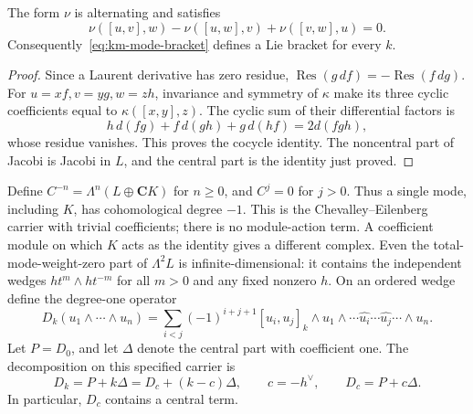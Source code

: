 \begin{lemma}
\label{lem:km-mode-cocycle}
The form $\nu$ is alternating and satisfies
\[
\nu([u,v],w)-\nu([u,w],v)+\nu([v,w],u)=0.
\]
Consequently~\eqref{eq:km-mode-bracket} defines a Lie bracket for every $k$.
\end{lemma}
\begin{proof}
Since a Laurent derivative has zero residue,
$\operatorname{Res}(g\,df)=-\operatorname{Res}(f\,dg)$.
For $u=xf,v=yg,w=zh$, invariance and symmetry of $\kappa$ make its three
cyclic coefficients equal to $\kappa([x,y],z)$.
The cyclic sum of their differential factors is
\[
h\,d(fg)+f\,d(gh)+g\,d(hf)=2d(fgh),
\]
whose residue vanishes.  This proves the cocycle identity.  The noncentral
part of Jacobi is Jacobi in $L$, and the central part is the identity just proved.
\end{proof}

Define $C^{-n}=\Lambda^n(L\oplus\mathbf CK)$ for $n\ge0$, and $C^j=0$ for
$j>0$.  Thus a single mode, including $K$, has cohomological degree $-1$.
This is the Chevalley--Eilenberg carrier with trivial coefficients; there
is no module-action term.  A coefficient module on which $K$ acts as the
identity gives a different complex.  Even the total-mode-weight-zero part
of $\Lambda^2L$ is infinite-dimensional: it contains the independent wedges
$ht^m\wedge ht^{-m}$ for all $m>0$ and any fixed nonzero $h$.
On an ordered wedge define the degree-one operator
\begin{equation}\label{eq:km-mode-ce}
D_k(u_1\wedge\cdots\wedge u_n)
=\sum_{i<j}(-1)^{i+j+1}[u_i,u_j]_k\wedge
u_1\wedge\cdots\widehat{u_i}\cdots\widehat{u_j}\cdots\wedge u_n.
\end{equation}
Let $P=D_0$, and let $\Delta$ denote the central part with coefficient one.
The decomposition on this specified carrier is
\begin{equation}\label{eq:bar-level-decomp}
D_k=P+k\Delta=D_c+(k-c)\Delta,
\qquad c=-h^\vee,\qquad D_c=P+c\Delta.
\end{equation}
In particular, $D_c$ contains a central term.

